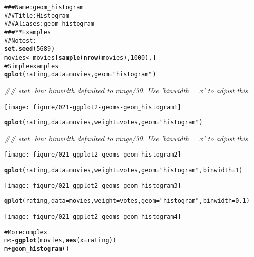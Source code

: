 \documentclass[a4paper,titlepage]{tufte-handout}\usepackage{graphicx, color}
\makeatletter
\def\maxwidth{ %
  \ifdim\Gin@nat@width>\linewidth
    \linewidth
  \else
    \Gin@nat@width
  \fi
}
\newcommand{\hlfunctioncall}[1]{\textcolor[rgb]{0.501960784313725,0,0.329411764705882}{\textbf{#1}}}%
\newcommand{\hlstring}[1]{\textcolor[rgb]{0.6,0.6,1}{#1}}%
\newcommand{\hlcomment}[1]{\textcolor[rgb]{0.180392156862745,0.6,0.341176470588235}{#1}}%
\newenvironment{kframe}{%
 \def\at@end@of@kframe{}%
 \ifinner\ifhmode%
  \def\at@end@of@kframe{\end{minipage}}%
  \begin{minipage}{\columnwidth}%
 \fi\fi%
 \def\FrameCommand##1{\hskip\@totalleftmargin \hskip-\fboxsep
 \colorbox{shadecolor}{##1}\hskip-\fboxsep
     \hskip-\linewidth \hskip-\@totalleftmargin \hskip\columnwidth}%
 \MakeFramed {\advance\hsize-\width
   \@totalleftmargin\z@ \linewidth\hsize
   \@setminipage}}%
 {\par\unskip\endMakeFramed%
 \at@end@of@kframe}
\newenvironment{knitrout}{}{} %
\makeatother
\begin{document}
\begin{knitrout}
\color{fgcolor}\begin{kframe}
\begin{alltt}
\hlcomment{### Name: geom_histogram}
\hlcomment{### Title: Histogram}
\hlcomment{### Aliases: geom_histogram}
\hlcomment{### ** Examples}
\hlcomment{## No test: }
\hlfunctioncall{set.seed}(5689)
movies <- movies[\hlfunctioncall{sample}(\hlfunctioncall{nrow}(movies), 1000), ]
\hlcomment{# Simple examples}
\hlfunctioncall{qplot}(rating, data=movies, geom=\hlstring{"histogram"})
\end{alltt}


{\ttfamily\noindent\itshape\textcolor{messagecolor}{\#\# stat\_bin: binwidth defaulted to range/30. Use 'binwidth = x' to adjust this.}}\end{kframe}\texttt{[image: figure/021-ggplot2-geoms-geom\_histogram1]} \begin{kframe}\begin{alltt}
\hlfunctioncall{qplot}(rating, data=movies, weight=votes, geom=\hlstring{"histogram"})
\end{alltt}


{\ttfamily\noindent\itshape\textcolor{messagecolor}{\#\# stat\_bin: binwidth defaulted to range/30. Use 'binwidth = x' to adjust this.}}\end{kframe}\texttt{[image: figure/021-ggplot2-geoms-geom\_histogram2]} \begin{kframe}\begin{alltt}
\hlfunctioncall{qplot}(rating, data=movies, weight=votes, geom=\hlstring{"histogram"}, binwidth=1)
\end{alltt}
\end{kframe}\texttt{[image: figure/021-ggplot2-geoms-geom\_histogram3]} \begin{kframe}\begin{alltt}
\hlfunctioncall{qplot}(rating, data=movies, weight=votes, geom=\hlstring{"histogram"}, binwidth=0.1)
\end{alltt}
\end{kframe}\texttt{[image: figure/021-ggplot2-geoms-geom\_histogram4]} \begin{kframe}\begin{alltt}
\hlcomment{# More complex}
m <- \hlfunctioncall{ggplot}(movies, \hlfunctioncall{aes}(x=rating))
m + \hlfunctioncall{geom_histogram}()
\end{alltt}



\end{kframe}
\end{knitrout}
\end{document}

